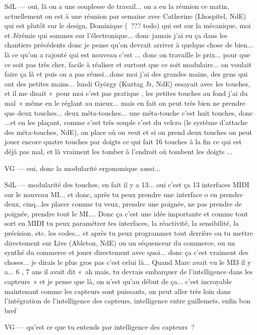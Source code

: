 SdL — oui, là on a une souplesse de travail... on a eu la réunion ce matin, actuellement on est à une réunion par semaine avec Catherine (Lhospitel, NdE) qui est plutôt sur le design, Dominique ( ??? todo) qui est sur la mécanique, moi et Jérémie qui sommes sur l'électronique... donc jamais j'ai eu ça dans les chantiers précédents donc je pense qu'on devrait arriver à quelque chose de bien... là ce qu'on a rajouté qui est nouveau c'est ... donc on travaille le prix... pour que ce soit pas très cher, facile à réaliser et surtout que ce soit modulaire... on voulait faire ça là et puis on a pas réussi...donc moi j'ai des grandes mains, des gens qui ont des petites mains... lundi György (Kurtag Jr, NdE) essayait avec les touches, et il me disait « pour moi c'est pas pratique , les petites touches au fond j'ai du mal » même en le réglant au mieux... mais en fait on peut très bien ne prendre que deux touches... deux méta-touches... une méta-touche c'est huit touches, donc ...et en les plaçant, comme c'est très souple c'est du velcro (le système d'attache des méta-touches, NdE), on place où on veut et si on prend deux touches on peut jouer encore quatre touches par doigts ce qui fait 16 touches à la fin ce qui est déjà pas mal, et là vraiment les tomber à l'endroit où tombent les doigts ... 

VG — oui, donc la modularité ergonomique aussi... 

SdL — modularité des touches, en fait il y a 13... oui c'est ça 13 interfaces MIDI sur le nouveau MI... et donc, après tu peux prendre une interface o en prendre deux, cinq...les placer comme tu veux, prendre une poignée, ne pas prendre de poignée, prendre tout le MI.... Donc ça c'est une idée importante et comme tout sort en MIDI tu peux paramétrer tes interfaces, la réactivité, la sensibilité, la précision, etc. les codes... et après tu peux programmer tout derrière ou tu mettre directement sur Live (Ableton, NdE) ou un séquenceur du commerce, ou un synthé du commerce et jouer directement avec quoi... donc ça c'est vraiment des choses... je dirais le plus gros pas c'est celui là... Quand Marc avait vu le MI3 il y a... 6 , 7 ans il avait dit « ah mais, tu devrais embarquer de l'intelligence dans les capteurs » et je pense que là, on n'est qu'au début de ça... c'est incroyable maintenant comme les capteurs sont puissants, on peut aller très loin dans l'intégration de l'intelligence des capteurs, intelligence entre guillemets, enfin bon bref 

VG — qu'est ce que tu entends par intelligence des capteurs ? 

